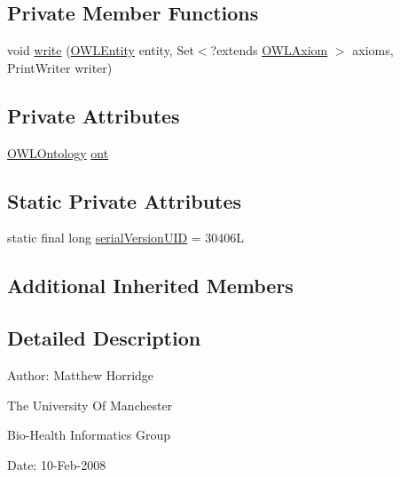 \subsection*{Private Member Functions}
\begin{DoxyCompactItemize}
\item 
void \hyperlink{classuk_1_1ac_1_1manchester_1_1cs_1_1owlapi_1_1dlsyntax_1_1_d_l_syntax_ontology_storer_base_ad67829ccc5317f1491aa57c24172a6b9}{write} (\hyperlink{interfaceorg_1_1semanticweb_1_1owlapi_1_1model_1_1_o_w_l_entity}{O\-W\-L\-Entity} entity, Set$<$?extends \hyperlink{interfaceorg_1_1semanticweb_1_1owlapi_1_1model_1_1_o_w_l_axiom}{O\-W\-L\-Axiom} $>$ axioms, Print\-Writer writer)
\end{DoxyCompactItemize}
\subsection*{Private Attributes}
\begin{DoxyCompactItemize}
\item 
\hyperlink{interfaceorg_1_1semanticweb_1_1owlapi_1_1model_1_1_o_w_l_ontology}{O\-W\-L\-Ontology} \hyperlink{classuk_1_1ac_1_1manchester_1_1cs_1_1owlapi_1_1dlsyntax_1_1_d_l_syntax_ontology_storer_base_a8ce3d5f0b4ae32145b43ce3c1220b3ba}{ont}
\end{DoxyCompactItemize}
\subsection*{Static Private Attributes}
\begin{DoxyCompactItemize}
\item 
static final long \hyperlink{classuk_1_1ac_1_1manchester_1_1cs_1_1owlapi_1_1dlsyntax_1_1_d_l_syntax_ontology_storer_base_a3bdd6a8eaad3ea4a2faa034933dbf4e1}{serial\-Version\-U\-I\-D} = 30406\-L
\end{DoxyCompactItemize}
\subsection*{Additional Inherited Members}


\subsection{Detailed Description}
Author\-: Matthew Horridge\par
 The University Of Manchester\par
 Bio-\/\-Health Informatics Group\par
 Date\-: 10-\/\-Feb-\/2008\par
\par
 

